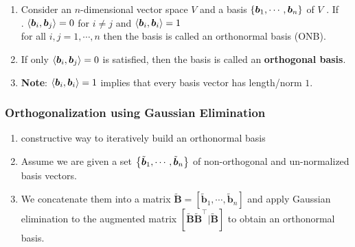 \begin{enumerate}
    \item
    \begin{definition}
        Consider an $n$-dimensional vector space $V$ and a basis $\left\{\bm{b}_1, \cdots , \bm{b}_n\right\}$ of $V$ . 
        If
        \hfill \cite{mfml/book/mml/Deisenroth-Faisal-Ong}
        \\
        .\hfill
        $\langle\bm{b}_i, \bm{b}_j\rangle = 0$ for $i \neq j$ and $\langle\bm{b}_i, \bm{b}_i\rangle = 1$
        \hfill \cite{mfml/book/mml/Deisenroth-Faisal-Ong}
        \\
        for all $i, j = 1, \cdots , n$ then the basis is called an orthonormal basis (ONB).
        \hfill \cite{mfml/book/mml/Deisenroth-Faisal-Ong}
    \end{definition}

    \item If only $\langle\bm{b}_i, \bm{b}_j\rangle = 0$ is satisfied, then the basis is called an \textbf{orthogonal basis}.
    \hfill \cite{mfml/book/mml/Deisenroth-Faisal-Ong}

    \item \textbf{Note}: $\langle\bm{b}_i, \bm{b}_i\rangle = 1$ implies that every basis vector has length/norm $1$.
    \hfill \cite{mfml/book/mml/Deisenroth-Faisal-Ong}

\end{enumerate}

\subsubsection{Orthogonalization using Gaussian Elimination}

\begin{enumerate}
    \item constructive way to iteratively build an orthonormal basis
    \hfill \cite{mfml/book/mml/Deisenroth-Faisal-Ong}

    \item Assume we are given a set $\left\{\tilde{\bm{b}}_1, \cdots ,\tilde{\bm{b}}_n\right\}$ of non-orthogonal and un-normalized basis vectors.
    \hfill \cite{mfml/book/mml/Deisenroth-Faisal-Ong}

    \item We concatenate them into a matrix $\tilde{\bm{B}} = [\tilde{\bm{b}}_1, \cdots ,\tilde{\bm{b}}_n]$ and apply Gaussian elimination to the augmented matrix $[\tilde{\bm{B}} \tilde{\bm{B}}^\top|\tilde{\bm{B}}]$ to obtain an orthonormal basis. 
    \hfill \cite{mfml/book/mml/Deisenroth-Faisal-Ong}
\end{enumerate}


